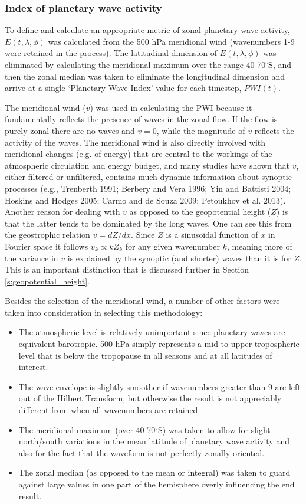 \subsubsection{Index of planetary wave activity}

To define and calculate an appropriate metric of zonal planetary wave activity, $E(t,\lambda,\phi)$ was calculated from the 500 hPa meridional wind (wavenumbers 1-9 were retained in the process). The latitudinal dimension of $E(t,\lambda,\phi)$ was eliminated by calculating the meridional maximum over the range 40-70$^{\circ}$S, and then the zonal median was taken to eliminate the longitudinal dimension and arrive at a single `Planetary Wave Index' value for each timestep, $PWI(t)$. 

The meridional wind ($v$) was used in calculating the PWI because it fundamentally reflects the presence of waves in the zonal flow. If the flow is purely zonal there are no waves and $v = 0$, while the magnitude of $v$ reflects the activity of the waves. The meridional wind is also directly involved with meridional changes (e.g. of energy) that are central to the workings of the atmospheric circulation and energy budget, and many studies have shown that $v$, either filtered or unfiltered, contains much dynamic information about synoptic processes (e.g., Trenberth 1991; Berbery and Vera 1996; Yin and Battisti 2004; Hoskins and Hodges 2005; Carmo and de Souza 2009; Petoukhov et al. 2013). Another reason for dealing with $v$ as opposed to the geopotential height ($Z$) is that the latter tends to be dominated by the long waves. One can see this from the geostrophic relation $v = dZ / dx$. Since $Z$ is a sinusoidal function of $x$ in Fourier space it follows $v_k \propto k Z_k$ for any given wavenumber $k$, meaning more of the variance in $v$ is explained by the synoptic (and shorter) waves than it is for $Z$. This is an important distinction that is discussed further in Section \ref{s:geopotential_height}.

Besides the selection of the meridional wind, a number of other factors were taken into consideration in selecting this methodology:
\begin{itemize}
\item The atmospheric level is relatively unimportant since planetary waves are equivalent barotropic. 500 hPa simply represents a mid-to-upper tropospheric level that is below the tropopause in all seasons and at all latitudes of interest.
\item The wave envelope is slightly smoother if wavenumbers greater than 9 are left out of the Hilbert Transform, but otherwise the result is not appreciably different from when all wavenumbers are retained.
\item The meridional maximum (over 40-70$^{\circ}$S) was taken to allow for slight north/south variations in the mean latitude of planetary wave activity and also for the fact that the waveform is not perfectly zonally oriented. 
\item The zonal median (as opposed to the mean or integral) was taken to guard against large values in one part of the hemisphere overly influencing the end result.
\end{itemize}

